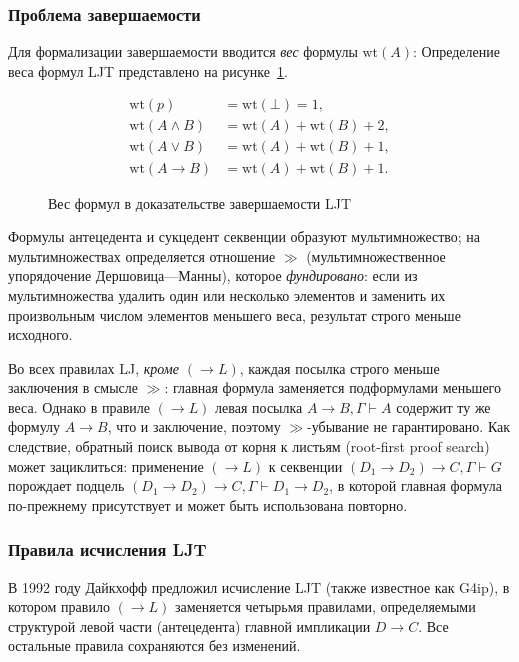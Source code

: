 \documentclass[14pt, russian]{scrartcl}
\begin{document}
\subsubsection{Проблема завершаемости}

Для формализации завершаемости вводится \emph{вес} формулы $\mathrm{wt}(A)$:
Определение веса формул LJT представлено на рисунке~\ref{fig:ljt-formula-weights}.

\begin{figure}[!htb]
\centering
\begin{align*}
\mathrm{wt}(p) &= \mathrm{wt}(\bot) = 1, \\
\mathrm{wt}(A \land B) &= \mathrm{wt}(A) + \mathrm{wt}(B) + 2, \\
\mathrm{wt}(A \lor B) &= \mathrm{wt}(A) + \mathrm{wt}(B) + 1, \\
\mathrm{wt}(A \rightarrow B) &= \mathrm{wt}(A) + \mathrm{wt}(B) + 1.
\end{align*}
\caption{Вес формул в доказательстве завершаемости LJT}
\label{fig:ljt-formula-weights}
\end{figure}
Формулы антецедента и сукцедент секвенции образуют мультимножество; на
мультимножествах определяется отношение $\gg$ (мультимножественное упорядочение
Дершовица---Манны), которое \emph{фундировано}: если из мультимножества удалить
один или несколько элементов и заменить их произвольным числом элементов меньшего
веса, результат строго меньше исходного.

Во всех правилах LJ, \emph{кроме $(\rightarrow L)$}, каждая посылка строго
меньше заключения в смысле $\gg$: главная формула заменяется подформулами
меньшего веса. Однако в правиле $(\rightarrow L)$ левая посылка
$A \rightarrow B, \Gamma \vdash A$ содержит ту же формулу $A \rightarrow B$, что
и заключение, поэтому $\gg$-убывание не гарантировано. Как следствие, обратный
поиск вывода от корня к листьям (root-first proof search) может зациклиться:
применение $(\rightarrow L)$ к секвенции $(D_1 \rightarrow D_2) \rightarrow C,
\Gamma \vdash G$ порождает подцель $(D_1 \rightarrow D_2) \rightarrow C, \Gamma
\vdash D_1 \rightarrow D_2$, в которой главная формула по-прежнему присутствует и
может быть использована повторно.

\subsubsection{Правила исчисления LJT}

В 1992 году Дайкхофф предложил исчисление LJT (также известное как G4ip), в
котором правило $(\rightarrow L)$ заменяется четырьмя правилами, определяемыми
структурой левой части (антецедента) главной импликации $D \rightarrow C$. Все
остальные правила сохраняются без изменений.
\end{document}
